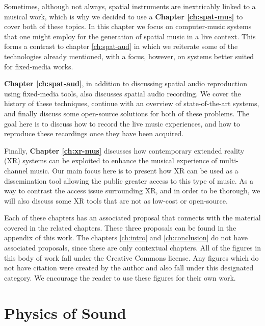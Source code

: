 Sometimes, although not always, spatial instruments are inextricably linked to a musical work, which is why we decided to use a \textbf{Chapter \ref{ch:spat-mus}} to cover both of these topics. In this chapter we focus on computer-music systems that one might employ for the generation of spatial music in a live context. This forms a contrast to chapter \ref{ch:spat-aud} in which we reiterate some of the technologies already mentioned, with a focus, however, on systems better suited for fixed-media works. 

\textbf{Chapter \ref{ch:spat-aud}}, in addition to discussing spatial audio reproduction using fixed-media tools, also discusses spatial audio recording. We cover the history of these techniques, continue with an overview of state-of-the-art systems, and finally discuss some open-source solutions for both of these problems. The goal here is to discuss how to record the live music experiences, and how to reproduce these recordings once they have been acquired. 

Finally, \textbf{Chapter \ref{ch:xr-mus}} discusses how contemporary extended reality (XR) systems can be exploited to enhance the musical experience of multi-channel music. Our main focus here is to present how XR can be used as a dissemination tool allowing the public greater access to this type of music. As a way to contrast the access issue surrounding XR, and in order to be thorough, we will also discuss some XR tools that are not as low-cost or open-source.

Each of these chapters has an associated proposal that connects with the material covered in the related chapters. These three proposals can be found in the appendix of this work. The chapters \ref{ch:intro} and  \ref{ch:conclusion} do not have associated proposals, since these are only contextual chapters. 
All of the figures in this body of work fall under the Creative Commons license. Any figures which do not have citation were created by the author and also fall under this designated category. We encourage the reader to use these figures for their own work. 


\section{Physics of Sound}

